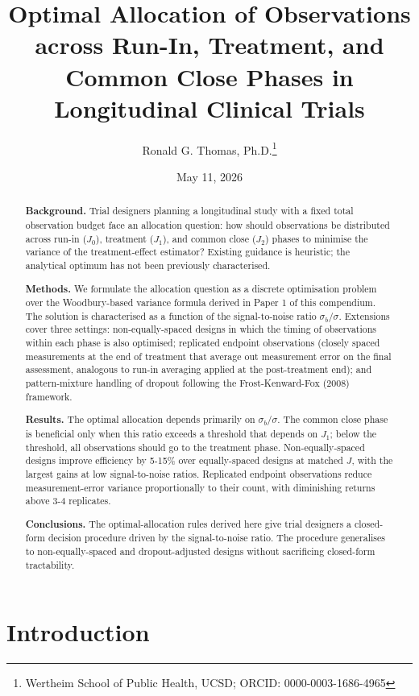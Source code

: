 \documentclass[
  11pt,
]{article}
\title{Optimal Allocation of Observations across Run-In, Treatment, and
Common Close Phases in Longitudinal Clinical Trials}
\author{Ronald G. Thomas,
Ph.D.\thanks{Wertheim School of Public Health, UCSD; ORCID: 0000-0003-1686-4965}}
\date{May 11, 2026}
\begin{document}
\maketitle
\begin{abstract}
\textbf{Background.} Trial designers planning a longitudinal study with
a fixed total observation budget face an allocation question: how should
observations be distributed across run-in (\(J_0\)), treatment
(\(J_1\)), and common close (\(J_2\)) phases to minimise the variance of
the treatment-effect estimator? Existing guidance is heuristic; the
analytical optimum has not been previously characterised.

\textbf{Methods.} We formulate the allocation question as a discrete
optimisation problem over the Woodbury-based variance formula derived in
Paper 1 of this compendium. The solution is characterised as a function
of the signal-to-noise ratio \(\sigma_b / \sigma\). Extensions cover
three settings: non-equally-spaced designs in which the timing of
observations within each phase is also optimised; replicated endpoint
observations (closely spaced measurements at the end of treatment that
average out measurement error on the final assessment, analogous to
run-in averaging applied at the post-treatment end); and pattern-mixture
handling of dropout following the Frost-Kenward-Fox (2008) framework.

\textbf{Results.} The optimal allocation depends primarily on
\(\sigma_b / \sigma\). The common close phase is beneficial only when
this ratio exceeds a threshold that depends on \(J_1\); below the
threshold, all observations should go to the treatment phase.
Non-equally-spaced designs improve efficiency by 5-15\% over
equally-spaced designs at matched \(J\), with the largest gains at low
signal-to-noise ratios. Replicated endpoint observations reduce
measurement-error variance proportionally to their count, with
diminishing returns above 3-4 replicates.

\textbf{Conclusions.} The optimal-allocation rules derived here give
trial designers a closed-form decision procedure driven by the
signal-to-noise ratio. The procedure generalises to non-equally-spaced
and dropout-adjusted designs without sacrificing closed-form
tractability.
\end{abstract}

{
\setcounter{tocdepth}{2}
\tableofcontents
}
\section{Introduction}\label{introduction}
\end{document}
